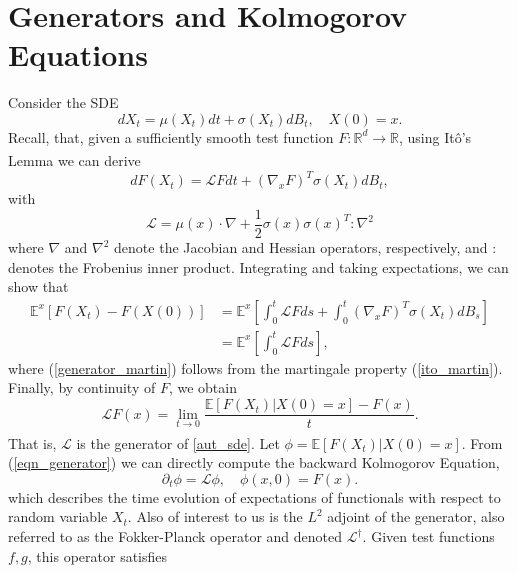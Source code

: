 \documentclass[11pt, twoside]{report}
\begin{document}
\section{Generators and Kolmogorov Equations}
Consider the SDE
\begin{equation} \label{aut_sde}
    dX_t = \mu(X_t) dt + \sigma(X_t) dB_t, \quad X(0) = x.
\end{equation}
Recall, that, given a sufficiently smooth test function $F: \mathbb{R}^d \xrightarrow[]{} \mathbb{R}$, using It\^{o}'s Lemma we can derive
\begin{equation} \label{ito_lem_gen}
    dF(X_t) = \mathcal{L}F dt + (\nabla_x F)^T \sigma(X_t) dB_t,
\end{equation}
with
\begin{equation} \label{generator_explicit}
    \mathcal{L} = \mu(x) \cdot \nabla + \frac{1}{2}\sigma(x)\sigma(x)^T : \nabla^2
\end{equation}
 where $\nabla$ and $\nabla^2$ denote the Jacobian and Hessian operators, respectively, and $:$ denotes the Frobenius inner product. Integrating and taking expectations, we can show that
\begin{align}
    \mathbb{E}^x\left[F(X_t) - F(X(0))\right] &= \mathbb{E}^x\left[\int_0^t \mathcal{L}F ds + \int_0^t (\nabla_x F)^T \sigma(X_t) dB_s \right] \label{generator_int} \\
    &= \mathbb{E}^x\left[\int_0^t \mathcal{L}F ds \right] \label{generator_martin},
\end{align}
where (\ref{generator_martin}) follows from the martingale property (\ref{ito_martin}). Finally, by continuity of $F$, we obtain
\begin{equation} \label{eqn_generator}
    \mathcal{L}F(x) = \lim_{t \xrightarrow[]{} 0}\frac{\mathbb{E}\left[F(X_t) | X(0) = x \right]- F(x)}{t}.
\end{equation}
That is, $\mathcal{L}$ is the generator of \ref{aut_sde}. Let $\phi = \mathbb{E}\left[F(X_t) | X(0) = x \right]$. From (\ref{eqn_generator}) we can directly compute the backward Kolmogorov Equation,
\begin{equation} \label{eqn_BKE}
    \partial_t \phi = \mathcal{L} \phi, \quad \phi(x,0) = F(x).
\end{equation}
which describes the time evolution of expectations of functionals with respect to random variable $X_t$. Also of interest to us is the $L^2$ adjoint of the generator, also referred to as the Fokker-Planck operator and denoted $\mathcal{L}^{\dagger}$. Given test functions $f,g$, this operator satisfies
\end{document}
